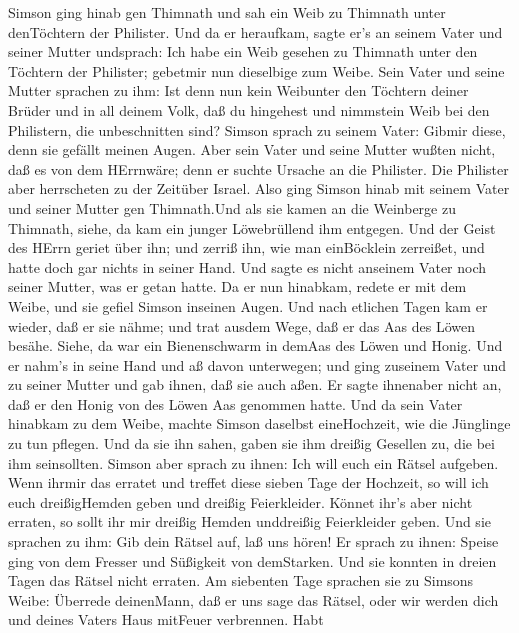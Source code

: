  Simson ging hinab gen Thimnath und sah ein Weib zu Thimnath
unter denTöchtern der Philister.  Und da er heraufkam, sagte
er's an seinem Vater und seiner Mutter undsprach: Ich habe ein Weib
gesehen zu Thimnath unter den Töchtern der Philister; gebetmir nun
dieselbige zum Weibe.  Sein Vater und seine Mutter sprachen
zu ihm: Ist denn nun kein Weibunter den Töchtern deiner Brüder und in
all deinem Volk, daß du hingehest und nimmstein Weib bei den Philistern,
die unbeschnitten sind? Simson sprach zu seinem Vater: Gibmir diese,
denn sie gefällt meinen Augen.  Aber sein Vater und seine
Mutter wußten nicht, daß es von dem HErrnwäre; denn er suchte Ursache an
die Philister. Die Philister aber herrscheten zu der Zeitüber Israel.
 Also ging Simson hinab mit seinem Vater und seiner Mutter
gen Thimnath.Und als sie kamen an die Weinberge zu Thimnath, siehe, da
kam ein junger Löwebrüllend ihm entgegen.  Und der Geist des
HErrn geriet über ihn; und zerriß ihn, wie man einBöcklein zerreißet,
und hatte doch gar nichts in seiner Hand. Und sagte es nicht anseinem
Vater noch seiner Mutter, was er getan hatte.  Da er nun
hinabkam, redete er mit dem Weibe, und sie gefiel Simson inseinen Augen.
 Und nach etlichen Tagen kam er wieder, daß er sie nähme;
und trat ausdem Wege, daß er das Aas des Löwen besähe. Siehe, da war ein
Bienenschwarm in demAas des Löwen und Honig.  Und er nahm's
in seine Hand und aß davon unterwegen; und ging zuseinem Vater und zu
seiner Mutter und gab ihnen, daß sie auch aßen. Er sagte ihnenaber nicht
an, daß er den Honig von des Löwen Aas genommen hatte.  Und
da sein Vater hinabkam zu dem Weibe, machte Simson daselbst
eineHochzeit, wie die Jünglinge zu tun pflegen.  Und da sie
ihn sahen, gaben sie ihm dreißig Gesellen zu, die bei ihm seinsollten.
 Simson aber sprach zu ihnen: Ich will euch ein Rätsel
aufgeben. Wenn ihrmir das erratet und treffet diese sieben Tage der
Hochzeit, so will ich euch dreißigHemden geben und dreißig Feierkleider.
 Könnet ihr's aber nicht erraten, so sollt ihr mir dreißig
Hemden unddreißig Feierkleider geben. Und sie sprachen zu ihm: Gib dein
Rätsel auf, laß uns hören!  Er sprach zu ihnen: Speise ging
von dem Fresser und Süßigkeit von demStarken. Und sie konnten in dreien
Tagen das Rätsel nicht erraten.  Am siebenten Tage sprachen
sie zu Simsons Weibe: Überrede deinenMann, daß er uns sage das Rätsel,
oder wir werden dich und deines Vaters Haus mitFeuer verbrennen. Habt
